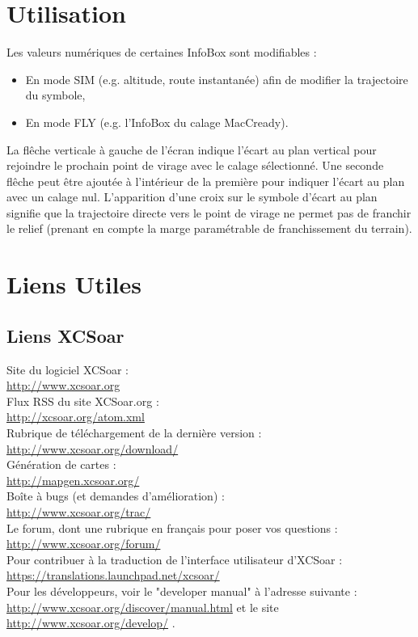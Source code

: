 \documentclass{article}
\begin{document}
\section{Utilisation}
\noindent
Les valeurs numériques de certaines InfoBox sont modifiables :
\begin{itemize}
\item  En mode SIM (e.g. altitude, route instantanée) afin de modifier la trajectoire du symbole,
\item En mode FLY (e.g. l'InfoBox du calage MacCready).
\end{itemize}
\noindent
\newline
La flêche verticale à gauche de l'écran indique l'écart au plan vertical pour rejoindre le prochain point de virage avec le calage sélectionné. Une seconde flêche peut être ajoutée à l'intérieur de la première pour indiquer l'écart au plan avec un calage nul. L'apparition d'une croix sur le symbole d'écart au plan signifie que la trajectoire directe vers le point de virage ne permet pas de franchir le relief (prenant en compte la marge paramétrable de franchissement du terrain).\\
\section{Liens Utiles}
\noindent
\label{LiensUtiles}
\subsection{Liens XCSoar}
\noindent
Site du logiciel XCSoar :\\
\url{http://www.xcsoar.org}\\
\newline
Flux RSS du site XCSoar.org :\\
\url{http://xcsoar.org/atom.xml}\\
\newline
Rubrique de téléchargement de la dernière version :\\
\url{http://www.xcsoar.org/download/}\\
\newline
Génération de cartes :\\
\url{http://mapgen.xcsoar.org/}\\
\newline
Boîte à bugs (et demandes d'amélioration) :\\ \url{http://www.xcsoar.org/trac/}\\
\newline
Le forum, dont une rubrique en français pour poser vos questions :\\
\url{http://www.xcsoar.org/forum/}\\
\newline
Pour contribuer à la traduction de l'interface utilisateur d'XCSoar :\\
\url{https://translations.launchpad.net/xcsoar/}\\
\newline
Pour les développeurs, voir le "developer manual" à l'adresse suivante : \url{http://www.xcsoar.org/discover/manual.html} et le site \url{http://www.xcsoar.org/develop/} .
%
\end{document}
